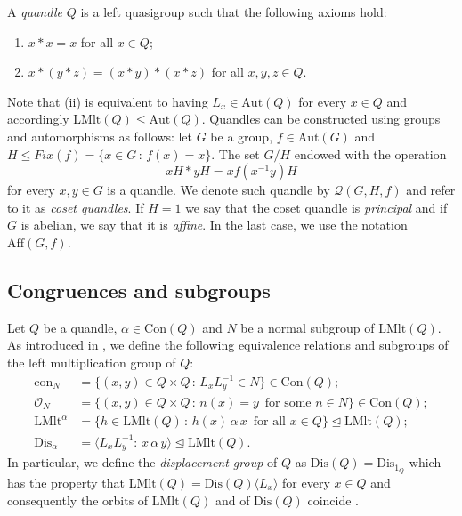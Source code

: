 \documentclass[a4paper, english, 9pt]{amsart}
\theoremstyle{plain}
\theoremstyle{definition}
\def\aut#1{\mathrm{Aut}(#1)}
\def\aff#1{\mathrm{Aff}#1}
\def\lmlt{\mathrm{LMlt}}
\def\dis{\mathrm{Dis}}
\def\con{\mathrm{Con}}
\def\c#1{\mathrm{con}_{#1}}
\def\setof#1#2{\{#1\,\colon\,#2\}}
\begin{document}
A {\it quandle} $Q$ is a left quasigroup such that the following axioms hold:
\begin{enumerate}[label=(\roman*)]
    \item $x*x=x$ for all $x\in Q$;
    \item $x*(y*z)=(x*y)*(x*z)$ for all $x,y,z\in Q$.
\end{enumerate}

Note that (ii) is equivalent to having $L_x\in \aut{Q}$ for every $x\in Q$ and accordingly $\lmlt(Q)\leq \aut{Q}$.
Quandles can be constructed using groups and automorphisms as follows: let $G$ be a group, $f\in \aut{G}$ and $H\leq Fix(f)=\setof{x\in G}{f(x)=x}$. The set $G/H$ endowed with the operation 
$$xH*yH=xf(x^{-1}y)H$$ 
for every $x,y\in G$ is a quandle. We denote such quandle by $\mathcal{Q}(G,H,f)$ and refer to it as {\it coset quandles}. If $H=1$ we say that the coset quandle is {\it principal} and if $G$ is abelian, we say that it is {\it affine}. In the last case, we use the notation $\aff(G,f)$.


\subsection{Congruences and subgroups} 




Let $Q$ be a quandle, $\alpha\in\con(Q)$ and $N$ be a normal subgroup of $\lmlt(Q)$. As introduced in \cite{CP}, we define the following equivalence relations and subgroups of the left multiplication group of $Q$: 
\begin{align*}
    \c{N} &= \{(x,y)\in Q\times Q\,\colon\, L_xL_y^{-1}\in N\}\in \con(Q); \\
    \mathcal{O}_N &= \{(x,y)\in Q\times Q\,\colon\, n(x)=y\,\text{ for some }n\in N\}\in \con(Q);\\%
    \lmlt^\alpha &= \{h\in\lmlt(Q)\,\colon\, h(x)\,\alpha\, x\,\text{ for all } x\in Q\}\trianglelefteq \lmlt(Q); \\
    \dis_\alpha &= \langle L_xL_y^{-1}\colon\, x\,\alpha\, y\rangle \trianglelefteq \lmlt(Q).
\end{align*}
In particular, we define the {\it displacement group} of $Q$ as $\dis(Q)=\dis_{1_Q}$ which has the property that $\lmlt(Q)=\dis(Q)\langle L_x\rangle$ for every $x\in Q$ and consequently the orbits of $\lmlt(Q)$ and of $\dis(Q)$ coincide \cite[Proposition 2.1]{hsv}.
\end{document}
